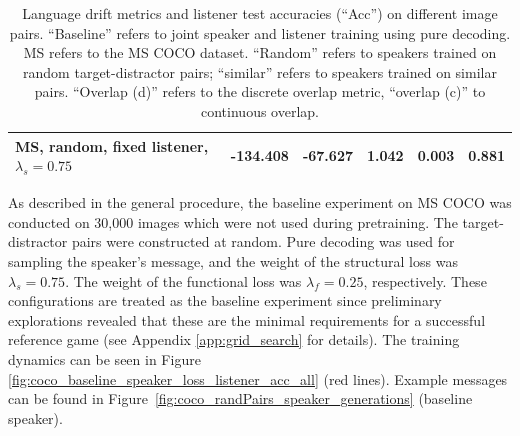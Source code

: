 \begin{table}[]
\begin{tabularx}{\textwidth}{|X|l|l|X|X|X|}
		MS, random, fixed listener, $\lambda_s = 0.75$  &         -134.408          &           -67.627             &     1.042                 &        0.003              &                          0.881     \\ \hline
	\end{tabularx}
\caption{\label{tab:coco_drift_metrics_basic} Language drift metrics and listener test accuracies (``Acc'') on different image pairs. 
	``Baseline'' refers to joint speaker and listener training using pure decoding. MS refers to the MS COCO dataset. ``Random'' refers to speakers trained on random target-distractor pairs; ``similar'' refers to speakers trained on similar pairs. ``Overlap (d)'' refers to the discrete overlap metric, ``overlap (c)'' to continuous overlap.}
\end{table}

As described in the general procedure, the baseline experiment on MS COCO was conducted on 30,000 images which were not used during pretraining. The target-distractor pairs were constructed at random. Pure decoding was used for sampling the speaker's message, and the weight of the structural loss was $\lambda_s = 0.75$. The weight of the functional loss was $\lambda_f = 0.25$, respectively. These configurations are treated as the baseline experiment since preliminary explorations revealed that these are the minimal requirements for a successful reference game (see Appendix \ref{app:grid_search} for details). The training dynamics can be seen in Figure \ref{fig:coco_baseline_speaker_loss_listener_acc_all} (red lines). Example messages can be found in Figure~\ref{fig:coco_randPairs_speaker_generations} (baseline speaker).


